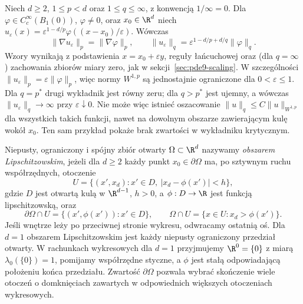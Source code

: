 \begin{uwaga}
\label{rem:pde10-critical}
Niech $d\ge2$, $1\le p<d$ oraz $1\le q\le\infty$,
z konwencją $1/\infty=0$.
Dla $\varphi\in C_c^\infty(B_1(0))$, $\varphi\ne0$, oraz
$x_0\in\R^d$ niech
$u_\varepsilon(x)=\varepsilon^{1-d/p}
\varphi((x-x_0)/\varepsilon)$. Wówczas
\[
 \|\nabla u_\varepsilon\|_p=\|\nabla\varphi\|_p,
 \qquad \|u_\varepsilon\|_q
 =\varepsilon^{1-d/p+d/q}\|\varphi\|_q.
\]
Wzory wynikają z podstawienia $x=x_0+\varepsilon y$,
reguły łańcuchowej oraz (dla $q=\infty$) zachowania
zbiorów miary zero, jak w sekcji~\ref{sec:pde9-scaling}.
W szczególności $\|u_\varepsilon\|_p=\varepsilon\|\varphi\|_p$,
więc normy $W^{1,p}$ są jednostajnie ograniczone dla
$0<\varepsilon\le1$. Dla $q=p^*$ drugi wykładnik
jest równy zeru; dla $q>p^*$ jest ujemny, a wówczas
$\|u_\varepsilon\|_q\to\infty$ przy $\varepsilon\downarrow0$.
Nie może więc istnieć
oszacowanie $\|u\|_q\le C\|u\|_{W^{1,p}}$ dla
wszystkich takich funkcji, nawet na dowolnym obszarze zawierającym kulę wokół $x_0$. Ten sam przykład pokaże
brak zwartości w wykładniku krytycznym.
\end{uwaga}

\begin{definicja}
\label{def:pde10-Lipschitz}
Niepusty, ograniczony i spójny zbiór otwarty
$\Omega\subset\R^d$ nazywamy \emph{obszarem Lipschitzowskim},
jeżeli dla $d\ge2$ każdy punkt $x_0\in\partial\Omega$
ma, po sztywnym ruchu współrzędnych, otoczenie
\[
 U=\{(x',x_d):x'\in D,\ |x_d-\phi(x')|<h\},
\]
gdzie $D$ jest otwartą kulą w $\R^{d-1}$, $h>0$,
a $\phi:D\to\R$ jest funkcją lipschitzowską, oraz
\[
 \partial\Omega\cap U=\{(x',\phi(x')):x'\in D\},
 \qquad
 \Omega\cap U=\{x\in U:x_d>\phi(x')\}.
\]
Jeśli wnętrze leży po przeciwnej stronie wykresu,
odwracamy ostatnią oś. Dla $d=1$ obszarem Lipschitzowskim
jest każdy niepusty ograniczony przedział otwarty.
W rachunkach wykresowych dla $d=1$ przyjmujemy
$\R^0=\{0\}$ z miarą $\lambda_0(\{0\})=1$,
pomijamy współrzędne styczne, a $\phi$ jest stałą
odpowiadającą położeniu końca przedziału.
Zwartość $\partial\Omega$ pozwala wybrać skończenie
wiele otoczeń o domknięciach zawartych w odpowiednich
większych otoczeniach wykresowych.
\end{definicja}

